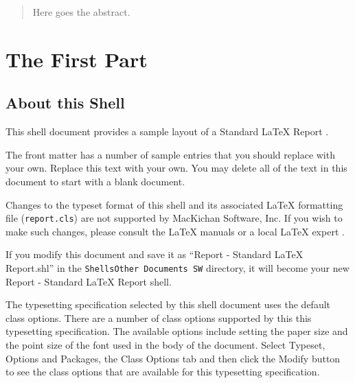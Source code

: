 \documentclass[11pt,spanish]{report}
\begin{document}
\begin{abstract}%
Here goes the abstract.%
\end{abstract}%

%

\part{The First Part}

\chapter{About this Shell}

This shell document provides a sample layout of a Standard LaTeX Report 
\citep{Gottesman1984,Griffith2004,Hartwell1999,Kaern2005,Keseler2005}%
.

The front matter has a number of sample entries that you should replace with
your own. Replace this text with your own. You may delete all of the text in
this document to start with a blank document.

Changes to the typeset format of this shell and its associated \LaTeX{}
formatting file (\texttt{report.cls}) are not supported by MacKichan
Software, Inc. If you wish to make such changes, please consult the \LaTeX{}
manuals or a local \LaTeX{} expert 
\citep{Kaern2005,Keseler2005,Lipschutz1986,Mason2006,Neidhardt1996}%
.

If you modify this document and save it as ``Report - Standard LaTeX
Report.shl'' in the \texttt{Shells\TEXTsymbol{\backslash}Other Documents%
\TEXTsymbol{\backslash}SW} directory, it will become your new Report -
Standard LaTeX Report shell.

The typesetting specification selected by this shell document uses the
default class options. There are a number of class options supported by this
this typesetting specification. The available options include setting the
paper size and the point size of the font used in the body of the document.
Select \textsf{Typeset, Options and Packages}, the \textsf{Class Options}
tab and then click the \textsf{Modify} button to see the class options that
are available for this typesetting specification.
\end{document}
